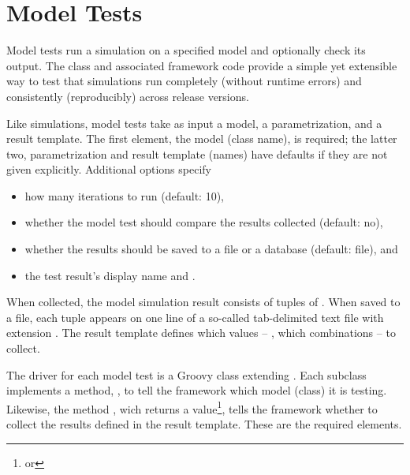 \section{Model Tests}

Model tests run a simulation on a specified model and optionally check its output.
The  class and associated framework code provide a simple yet 
extensible way to test that simulations run completely (without runtime errors) 
and consistently (reproducibly) across release versions.

Like simulations, model tests take as input a model, a parametrization, and a result 
template. The first element, the model (class name), is required; the latter two, 
parametrization and result template (names) have defaults if they are not given 
explicitly. Additional options specify 
\begin{itemize}\tightitemize{0pt}
	\item how many iterations to run (default: 10),
	\item whether the model test should compare the results collected (default: no),
	\item whether the results should be saved to a file or a database (default: file), and 
	\item the test result's display name and .
\end{itemize}

When collected, the model simulation result consists of tuples of . When saved to a file, each tuple appears on one line
of a so-called tab-delimited text file with extension .
The result template defines which values -- \ie, which  
combinations -- to collect.

The driver for each model test is a Groovy class extending .
Each  subclass implements a method, , to tell 
the framework which model (class) it is testing. Likewise, the method 
, wich returns a  value\footnote{
 or }, tells the framework whether to collect the results
defined in the result template. These are the required  elements.

